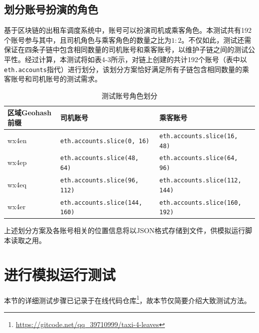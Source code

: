 \subsection{划分账号扮演的角色}

基于区块链的出租车调度系统中，账号可以扮演司机或乘客角色。本测试共有192个账号参与其中，且司机角色与乘客角色的数量之比为$1:2$。不仅如此，测试还需保证在四条子链中包含相同数量的司机账号和乘客账号，以维护子链之间的测试公平性。经过计算，本测试将如表4-3所示，对链上创建的共计192个账号（表中以\verb|eth.accounts|指代）进行划分，该划分方案恰好满足所有子链包含相同数量的乘客账号和司机账号的测试需求。

\begin{table}[htbp]
    \linespread{1.5}
    \centering
    \caption{测试账号角色划分}\label{测试账号角色划分}
    \begin{tabular}{l|l|l} \toprule
        区域Geohash前缀 & 司机账号                                & 乘客账号                                \\\hline
        wx4en       & \verb|eth.accounts.slice(0, 16)|    & \verb|eth.accounts.slice(16, 48)|   \\
        wx4ep       & \verb|eth.accounts.slice(48, 64)|   & \verb|eth.accounts.slice(64, 96)|   \\
        wx4eq       & \verb|eth.accounts.slice(96, 112)|  & \verb|eth.accounts.slice(112, 144)| \\
        wx4er       & \verb|eth.accounts.slice(144, 160)| & \verb|eth.accounts.slice(160, 192)| \\
        \bottomrule
    \end{tabular}
\end{table}

上述划分方案及各账号相关的位置信息将以JSON格式存储到文件，供模拟运行脚本读取之用。

\section{进行模拟运行测试}

本节的详细测试步骤已记录于在线代码仓库\footnote{\url{https://gitcode.net/qq_39710999/taxi-4-leaves}}，故本节仅简要介绍大致测试方法。

